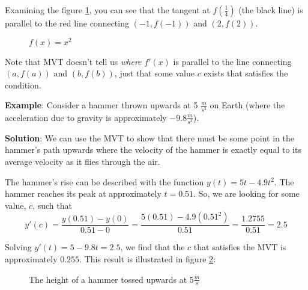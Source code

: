 Examining the figure \ref{fig:MVT1}, you can see that the tangent at 
$f(\frac{1}{4})$ (the black line) is parallel to the red line connecting 
$(-1, f(-1))$ and $(2, f(2))$. 

\begin{figure}[htbp]
\caption{$f(x) = x^2$}
\label{fig:MVT1}
\end{figure}

Note that MVT doesn't tell us \textit{where} $f'(x)$ is parallel to the line 
connecting $(a, f(a))$ and $(b, f(b))$, just that some value $c$ exists that 
satisfies the condition. 

\textbf{Example}: Consider a hammer thrown upwards at 5 $\frac{m}{s^2}$ on 
Earth (where the acceleration due to gravity is approximately $-9.8 
\frac{m}{s^2}$). 

\textbf{Solution}: We can use the MVT to show that there must be some point in 
the hammer's path upwards where the velocity of the hammer is exactly equal to 
its average velocity as it flies through the air. 

The hammer's rise can be described with the function $y(t) = 5t-4.9t^2$. The 
hammer reaches its peak at approximately $t=0.51$. So, we are looking for some 
value, $c$, such that $$y'(c) = \frac{y(0.51) - y(0)}{0.51 - 0} = \frac{5(0.51) 
- 4.9(0.51^2)}{0.51} = \frac{1.2755}{0.51} = 2.5$$

Solving $y'(t) = 5-9.8t = 2.5$, we find that the $c$ that satisfies the MVT is 
approximately $0.255$. This result is illustrated in figure \ref{fig:hammer}:

\begin{figure}[htbp]
\centering
{}
\caption{The height of a hammer tossed upwards at $5 \frac{m}{s}$}
\label{fig:hammer}
\end{figure}

